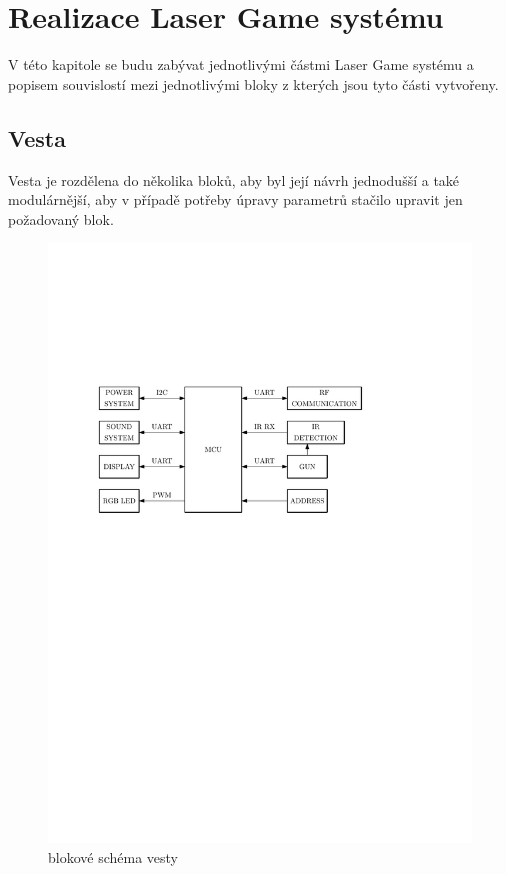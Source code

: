 \chapter{Realizace Laser Game systému}

 V této kapitole se budu zabývat jednotlivými částmi Laser Game systému a popisem souvislostí mezi jednotlivými bloky z kterých jsou tyto části vytvořeny.

\section{Vesta}

Vesta je rozdělena do několika bloků, aby byl její návrh jednodušší a také modulárnější, aby v případě potřeby úpravy parametrů stačilo upravit jen požadovaný blok.

\begin{figure}[H]
    \begin{center}
        \includegraphics[width=\textwidth]{img/vest-system}
    \end{center}
    \caption{blokové schéma vesty}
\end{figure}

